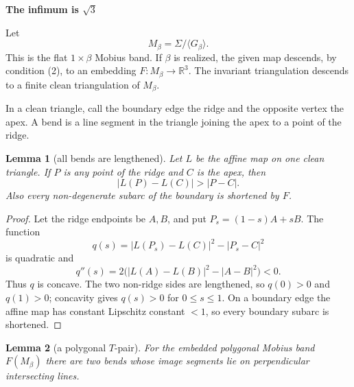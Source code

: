 \documentclass[12pt]{article}
\newtheorem{lemma}{Lemma}
\newcommand{\R}{\mathbb R}
\begin{document}
\begin{center}
{\bf The infimum is \(\sqrt3\)}
\end{center}

Let
\[
        M_\beta=\Sigma/\langle G_\beta\rangle .
\]
This is the flat \(1\times \beta\) Mobius band.  If \(\beta\) is
realized, the given map descends, by condition (2), to an embedding
\(F:M_\beta\to \R^3\).  The invariant triangulation descends to a finite
clean triangulation of \(M_\beta\).

In a clean triangle, call the boundary edge the ridge and the opposite
vertex the apex.  A bend is a line segment in the triangle joining the
apex to a point of the ridge.

\begin{lemma}[all bends are lengthened]\label{lem:lengthen}
Let \(L\) be the affine map on one clean triangle.  If \(P\) is any point
of the ridge and \(C\) is the apex, then
\[
        |L(P)-L(C)|>|P-C|.
\]
Also every non-degenerate subarc of the boundary is shortened by \(F\).
\end{lemma}

\begin{proof}
Let the ridge endpoints be \(A,B\), and put
\(P_s=(1-s)A+sB\).  The function
\[
 q(s)= |L(P_s)-L(C)|^2-|P_s-C|^2
\]
is quadratic and
\[
 q''(s)=2\big(|L(A)-L(B)|^2-|A-B|^2\big)<0.
\]
Thus \(q\) is concave.  The two non-ridge sides are lengthened, so
\(q(0)>0\) and \(q(1)>0\); concavity gives \(q(s)>0\) for
\(0\le s\le1\).  On a boundary edge the affine map has constant Lipschitz
constant \(<1\), so every boundary subarc is shortened.
\end{proof}

\begin{lemma}[a polygonal \(T\)-pair]\label{lem:T}
For the embedded polygonal Mobius band \(F(M_\beta)\) there are two bends
whose image segments lie on perpendicular intersecting lines.
\end{lemma}
\end{document}
